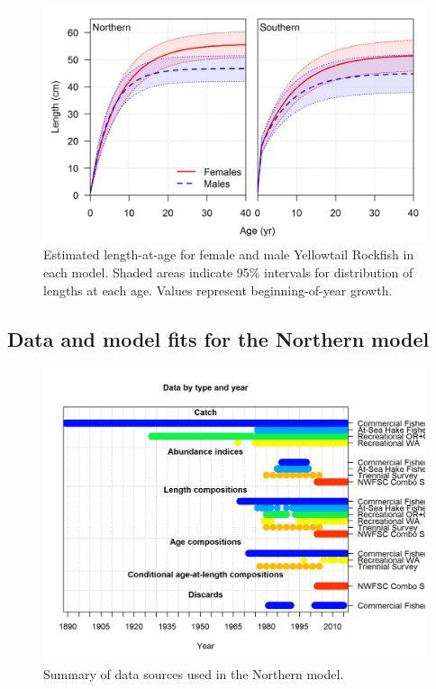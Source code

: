 \documentclass[12pt,]{article}
\begin{document}
\begin{figure}[htbp]
\centering
\includegraphics{r4ss/plots_compare/growth_comparison.png}
\caption{Estimated length-at-age for female and male Yellowtail Rockfish
in each model. Shaded areas indicate 95\% intervals for distribution of
lengths at each age. Values represent beginning-of-year growth.
\label{fig:growth}}
\end{figure}

\FloatBarrier 

\newpage

\subsection{Data and model fits for the Northern
model}\label{data-and-model-fits-for-the-northern-model}

\begin{figure}[htbp]
\centering
\includegraphics{r4ss/plots_mod1/data_plot.png}
\caption{Summary of data sources used in the Northern model.
\label{fig:data_plot}}
\end{figure}
\end{document}
